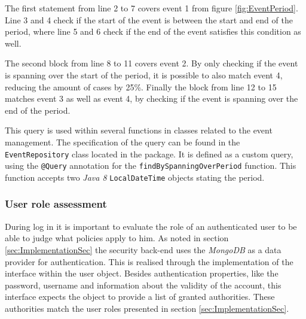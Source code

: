 The first statement from line 2 to 7 covers event 1 from figure \vref{fig:EventPeriod}. Line 3 and 4 check if the start of the event is between the start and end of the period, where line 5 and 6 check if the end of the event satisfies this condition as well. 

The second block from line 8 to 11 covers event 2. By only checking if the event is spanning over the start of the period, it is possible to also match event 4, reducing the amount of cases by 25\%. Finally the block from line 12 to 15 matches event 3 as well as event 4, by checking if the event is spanning over the end of the period. 

This query is used within several functions in classes related to the event management. The specification of the query can be found in the \texttt{EventRepository} class located in the  package. It is defined as a custom query, using the \texttt{@Query} annotation for the \texttt{findBySpanningOverPeriod} function. This function accepts two \emph{Java 8} \texttt{LocalDateTime} objects stating the period.

\subsubsection{User role assessment}

During log in it is important to evaluate the role of an authenticated user to be able to judge what policies apply to him. As noted in section \vref{sec:ImplementationSec} the security back-end uses the \emph{MongoDB} as a data provider for authentication. This is realised through the implementation of the  interface within the user object. Besides authentication properties, like the password, username and information about the validity of the account, this interface expects the object to provide a list of granted authorities. These authorities match the user roles presented in section \vref{sec:ImplementationSec}. 


